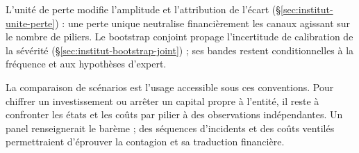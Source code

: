 L'unité de perte modifie l'amplitude et l'attribution de l'écart
(\S\ref{sec:institut-unite-perte}) : une perte unique neutralise financièrement les
canaux agissant sur le nombre de piliers. Le bootstrap conjoint propage l'incertitude
de calibration de la sévérité (\S\ref{sec:institut-bootstrap-joint}) ; ses bandes
restent conditionnelles à la fréquence et aux hypothèses d'expert.

La comparaison de scénarios est l'usage accessible sous ces conventions. Pour chiffrer un
investissement ou arrêter un capital propre à l'entité, il reste à confronter les états et les coûts
par pilier à des observations indépendantes. Un panel renseignerait le barème ; des séquences
d'incidents et des coûts ventilés permettraient d'éprouver la contagion et sa traduction financière.

